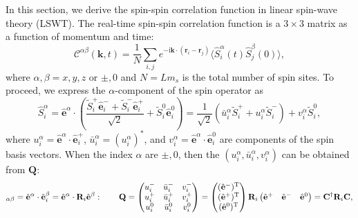 \documentclass[aps, prx, nofootinbib, superscriptaddress]{revtex4-2}
\newcommand{\kvec}{\mathbf{k}}
\newcommand{\ri}{\mathrm{i}}
\begin{document}
In this section, we derive the spin-spin correlation function in linear spin-wave theory (LSWT). The real-time spin-spin correlation function is a $3 \times 3$ matrix as a function of momentum and time:
\begin{equation}
    \mathcal{C}^{\alpha\beta}(\kvec, t) = \frac{1}{N} \sum_{i, j} e^{-\ri \kvec \cdot (\mathbf{r}_{i} - \mathbf{r}_{j})} \langle \hat{S}_{i}^{\alpha}(t) \hat{S}_{j}^{\beta}(0) \rangle,
\end{equation}
where $\alpha, \beta = x, y, z$ or $\pm, 0$ and $N = L m_s$ is the total number of spin sites. To proceed, we express the $\alpha$-component of the spin operator as 
\begin{equation}
    \hat{S}^{\alpha}_{i} 
    = \hat{\mathbf{e}}^{\alpha} \cdot \left( \frac{\widetilde{S}_{i}^{+} \hat{\mathbf{e}}^{-}_{i} + \widetilde{S}_{i}^{-} \hat{\mathbf{e}}^{+}_{i}}{\sqrt{2}} + \widetilde{S}^{0}_{i} \hat{\mathbf{e}}^{0}_{i} \right) 
    = \frac{1}{\sqrt{2}} \left( \bar{u}^{\alpha}_{i} \widetilde{S}_{i}^{+} + u^{\alpha}_{i} \widetilde{S}_{i}^{-} \right) + v^{\alpha}_{i} \widetilde{S}^{0}_{i},
\end{equation}
where $u^{\alpha}_{i} = \hat{\mathbf{e}}^{\alpha} \cdot \hat{\mathbf{e}}^{+}_{i}$, $\bar{u}^{\alpha}_{i} = (u^{\alpha}_{i})^*$, and $v^{\alpha}_{i} = \hat{\mathbf{e}}^{\alpha} \cdot \hat{\mathbf{e}}^{0}_{i}$ are components of the spin basis vectors. 
When the index $\alpha$ are $\pm,0$, then the $(u^{\alpha}_{i}, \bar{u}^{\alpha}_{i}, v^{\alpha}_{i})$ can be obtained from $\mathbf{Q}$:
\begin{equation}
    [\mathbf{Q}]_{\alpha\beta} = 
    \hat{\mathbf{e}}^{\alpha} \cdot \hat{\mathbf{e}}^{\beta}_{i} = 
    \hat{\mathbf{e}}^{\alpha} \cdot \mathbf{R}_{i} \hat{\mathbf{e}}^{\beta}: 
    \qquad
    \mathbf{Q}
    =
    \begin{pmatrix}
            u^{-}_{i} &   \bar{u}^{-}_{i}     &   v_{i}^{-}   \\
            u^{+}_{i} &   \bar{u}^{+}_{i}     &   v_{i}^{+}   \\
            u^{0}_{i} &   \bar{u}^{0}_{i}     &   v_{i}^{0}   \\
    \end{pmatrix}
    = 
    \begin{pmatrix}
        (\hat{\mathbf{e}}^{-})^{\rm T} \\  
        (\hat{\mathbf{e}}^{+})^{\rm T} \\  
        (\hat{\mathbf{e}}^{0})^{\rm T} 
    \end{pmatrix}
    \mathbf{R}_{i}
    \begin{pmatrix}
        \hat{\mathbf{e}}^{+} & \hat{\mathbf{e}}^{-} & \hat{\mathbf{e}}^{0}
    \end{pmatrix}
    = \mathbf{C}^{\dagger} \mathbf{R}_{i} \mathbf{C},
\end{equation}
\end{document}

